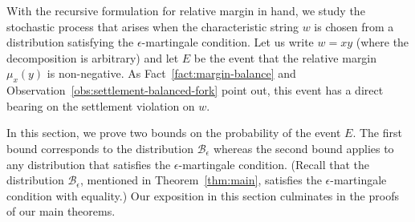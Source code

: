 With the recursive formulation for relative margin in hand, 
we study the stochastic process that arises when the
characteristic string $w$ is chosen from a distribution 
satisfying the $\epsilon$-martingale condition. 
Let us write $w = xy$ (where the decomposition is arbitrary) and 
let $E$ be the event that the relative margin $\mu_x(y)$ is non-negative. 
As Fact~\ref{fact:margin-balance} and Observation~\ref{obs:settlement-balanced-fork} point out, 
this event has a direct bearing on the settlement violation on $w$. 

In this section, we prove two bounds on the probability of the event $E$.
The first bound corresponds to the distribution 
$\mathcal{B}_\epsilon$ 
whereas the second bound applies to any distribution that 
satisfies the $\epsilon$-martingale condition. 
(Recall that the distribution $\mathcal{B}_\epsilon$, mentioned in Theorem~\ref{thm:main}, 
satisfies the $\epsilon$-martingale condition with equality.)
Our exposition in this section culminates in the proofs of our main theorems. 


